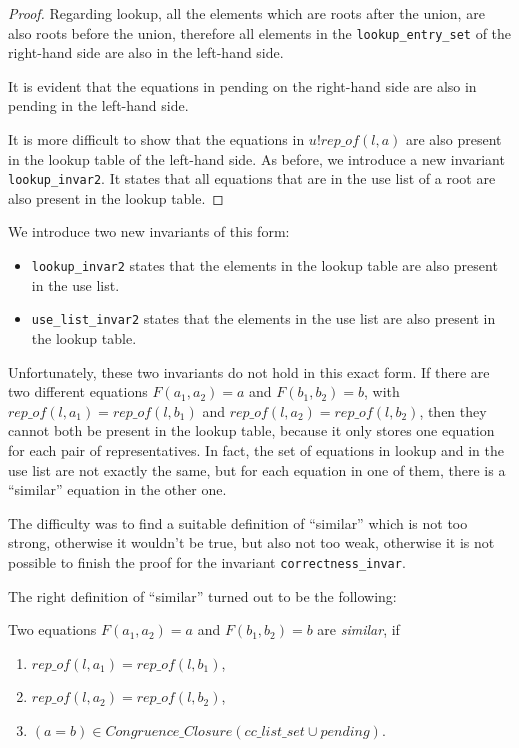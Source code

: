 \begin{proof}
Regarding lookup, all the elements which are roots after the union, are also roots before the union, therefore all elements in the \lstinline{lookup_entry_set} of the right-hand side are also in the left-hand side.

It is evident that the equations in pending on the right-hand side are also in pending in the left-hand side.

It is more difficult to show that the equations in $u ! rep\_of(l, a)$ are also present in the lookup table of the left-hand side. As before, we introduce a new invariant \lstinline{lookup_invar2}. It states that all equations that are in the use list of a root are also present in the lookup table.
\end{proof}

We introduce two new invariants of this form:
\begin{itemize}
    \item \lstinline{lookup_invar2} states that the elements in the lookup table are also present in the use list.
	\item \lstinline{use_list_invar2} states that the elements in the use list are also present in the lookup table.
\end{itemize}

Unfortunately, these two invariants do not hold in this exact form. If there are two different equations $F(a_1,a_2) = a$ and $F(b_1, b_2) = b$, with $rep\_of(l, a_1) = rep\_of(l, b_1)$ and $rep\_of(l, a_2) = rep\_of(l, b_2)$, then they cannot both be present in the lookup table, because it only stores one equation for each pair of representatives. In fact, the set of equations in lookup and in the use list are not exactly the same, but for each equation in one of them, there is a ``similar'' equation in the other one.

The difficulty was to find a suitable definition of ``similar'' which is not too strong, otherwise it wouldn't be true, but also not too weak, otherwise it is not possible to finish the proof for the invariant \lstinline{correctness_invar}.

The right definition of ``similar'' turned out to be the following:

\begin{definition}
Two equations $F(a_1, a_2) = a$ and $F(b_1, b_2) = b$ are \emph{similar}, if
\begin{enumerate}[label=(\roman*)]
\itemsep0em
    \item $rep\_of(l, a_1) = rep\_of(l, b_1)$,
    \item $rep\_of(l, a_2) = rep\_of(l, b_2)$,
    \item $(a=b) \in Congruence\_Closure (cc\_list\_set \cup pending)$.
\end{enumerate}
\end{definition}

